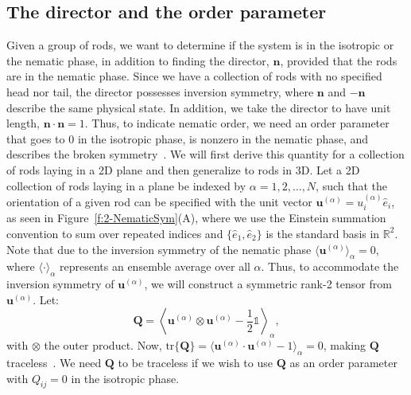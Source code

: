 \subsection{The director and the order parameter}
Given a group of rods, we want to determine if the system is in the isotropic or the nematic phase, in addition to finding the director, $\mathbf{n}$, provided that the rods are in the nematic phase.
Since we have a collection of rods with no specified head nor tail, the director possesses inversion symmetry, where $\mathbf{n}$ and $-\mathbf{n}$ describe the same physical state.
In addition, we take the director to have unit length, $\mathbf{n}\cdot\mathbf{n} = 1$.
Thus, to indicate nematic order, we need an order parameter that goes to $0$ in the isotropic phase, is nonzero in the nematic phase, and describes the broken symmetry~\cite{RN33,RN175}.
We will first derive this quantity for a collection of rods laying in a 2D plane and then generalize to rods in 3D.
Let a 2D collection of rods laying in a plane be indexed by $\alpha = 1,2,\dots, N$, such that the orientation of a given rod can be specified with the unit vector $\mathbf{u}^{(\alpha)} = u^{(\alpha)}_i\hat{e}_i$, as seen in Figure~\ref{f:2-NematicSym}(A), where we use the Einstein summation convention to sum over repeated indices and $\{\hat{e}_1,\hat{e}_2  \}$ is the standard basis in $\mathbb{R}^2$.
Note that due to the inversion symmetry of the nematic phase $\langle \mathbf{u}^{(\alpha)}\rangle_{\alpha} = 0$, where $\langle \cdot \rangle_{\alpha}$ represents an ensemble average over all $\alpha$.
Thus, to accommodate the inversion symmetry of $\mathbf{u}^{(\alpha)}$, we will construct a symmetric rank-2 tensor from $\mathbf{u}^{(\alpha)}$.
Let:
\begin{equation}
  \mathbf{Q} = \left \langle \mathbf{u}^{(\alpha)} \otimes \mathbf{u}^{(\alpha)} - \frac{1}{2} \mathbb{1} \right \rangle_{\alpha},\label{e:2-2DOrderRaw}
\end{equation}
with $\otimes$ the outer product.
Now, $\textrm{tr}\big \{ \mathbf{Q} \big \} = \langle \mathbf{u}^{(\alpha)} \cdot \mathbf{u}^{(\alpha)} - 1 \rangle_{\alpha} = 0$, making $\mathbf{Q}$ traceless~\cite{RN33,RN175}.
We need $\mathbf{Q}$ to be traceless if we wish to use $\mathbf{Q}$ as an order parameter with $Q_{ij} = 0$ in the isotropic phase.

